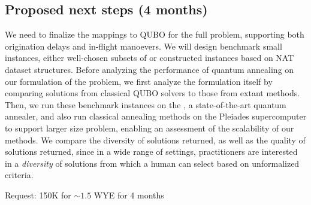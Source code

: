 \subsection*{Proposed next steps (4 months)}\label{sec:ass}

We need to finalize the mappings to QUBO for the full problem,
supporting both origination delays and in-flight manoevers.
We will design benchmark small instances, either well-chosen subsets of 
or constructed instances based on NAT dataset structures. 
Before analyzing the performance of quantum annealing on our
formulation of the problem, we first analyze the formulation itself by
comparing solutions from classical QUBO solvers to those from extant methods.
Then, we run these benchmark instances on the \DW, a
state-of-the-art quantum annealer, and also 
run classical annealing methods on the Pleiades supercomputer 
to support larger size problem, enabling an assessment of 
the scalability of our methods.  
We compare the diversity of solutions returned,
as well as the quality of solutions 
returned,
since in a wide range of settings, practitioners are interested in 
a \emph{diversity} of
solutions from which a human can select based on unformalized criteria.



Request: 150K for $\sim1.5$ WYE for 4 months

